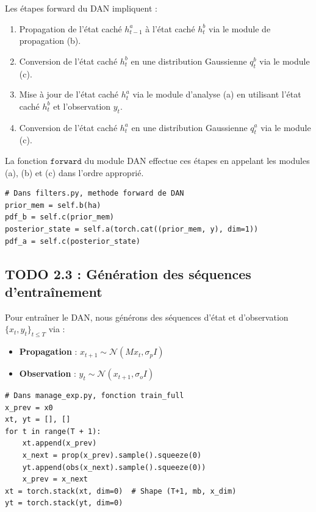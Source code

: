 \documentclass[12pt,a4paper]{article}
\begin{document}
Les étapes forward du DAN impliquent :
\begin{enumerate}
    \item Propagation de l'état caché $h^a_{t -1}$ à l'état caché $h^b_t$ via le module de propagation (b).
    \item Conversion de l'état caché $h^b_t$ en une distribution Gaussienne $q^b_t$ via le module (c).
    \item Mise à jour de l'état caché $h^a_t$ via le module d'analyse (a) en utilisant l'état caché $h^b_t$ et l'observation $y_t$.
    \item Conversion de l'état caché $h^a_t$ en une distribution Gaussienne $q^a_t$ via le module (c). 
\end{enumerate}

La fonction $\texttt{forward}$ du module DAN effectue ces étapes en appelant les modules (a), (b) et (c) dans l'ordre approprié. \\

\begin{lstlisting}
# Dans filters.py, methode forward de DAN
prior_mem = self.b(ha)
pdf_b = self.c(prior_mem)
posterior_state = self.a(torch.cat((prior_mem, y), dim=1))
pdf_a = self.c(posterior_state)
\end{lstlisting}

\vspace{0.5cm}


\subsection*{TODO 2.3 : Génération des séquences d'entraînement}

Pour entraîner le DAN, nous générons des séquences d'état et d'observation $\{x_t, y_t\}_{t \leq T}$ via :
\begin{itemize}
    \item \textbf{Propagation} : $x_{t+1} \sim \mathcal{N}(M x_t, \sigma_p I)$
    \item \textbf{Observation} : $y_t \sim \mathcal{N}(x_{t+1}, \sigma_o I)$ \\
\end{itemize}

\begin{lstlisting}
# Dans manage_exp.py, fonction train_full
x_prev = x0
xt, yt = [], []
for t in range(T + 1):
    xt.append(x_prev)
    x_next = prop(x_prev).sample().squeeze(0)
    yt.append(obs(x_next).sample().squeeze(0))
    x_prev = x_next
xt = torch.stack(xt, dim=0)  # Shape (T+1, mb, x_dim)
yt = torch.stack(yt, dim=0)
\end{lstlisting}
\end{document}
